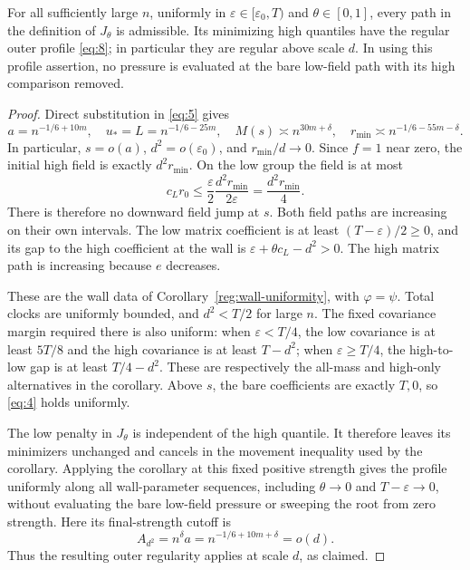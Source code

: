 \begin{lemma}
\label{fl:wall-profile}
For all sufficiently large $n$, uniformly in
$\varepsilon\in[\varepsilon_0,T)$ and $\theta\in[0,1]$, every path
in the definition of $J_\theta$ is admissible.  Its minimizing high
quantiles have the regular outer profile \eqref{eq:8}; in particular
they are regular above scale $d$.  In using this profile assertion,
no pressure is evaluated at the bare low-field path with its high
comparison removed.
\end{lemma}

\begin{proof}
Direct substitution in \eqref{eq:5} gives
\[
 a=n^{-1/6+10m},\quad u_*=L=n^{-1/6-25m},\quad
 M(s)\asymp n^{30m+\delta},\quad
 r_{\min}\asymp n^{-1/6-55m-\delta}.
\]
In particular, $s=o(a)$, $d^2=o(\varepsilon_0)$, and
$r_{\min}/d\to0$.  Since $f=1$ near zero, the initial high field is
exactly $d^2r_{\min}$.  On the low group the field is at most
\[
 c_Lr_0\le\frac\varepsilon2
                   \frac{d^2r_{\min}}{2\varepsilon}
             =\frac{d^2r_{\min}}4.
\]
There is therefore no downward field jump at $s$.  Both field paths
are increasing on their own intervals.  The low matrix coefficient
is at least $(T-\varepsilon)/2\ge0$, and its gap to the high coefficient
at the wall is $\varepsilon+\theta c_L-d^2>0$.  The high matrix path
is increasing because $e$ decreases.

These are the wall data of Corollary~\ref{reg:wall-uniformity}, with
$\varphi=\psi$. Total clocks are uniformly bounded, and $d^2<T/2$
for large $n$. The fixed covariance margin required there is also
uniform: when $\varepsilon<T/4$, the low covariance is at least
$5T/8$ and the high covariance is at least $T-d^2$; when
$\varepsilon\ge T/4$, the high-to-low gap is at least $T/4-d^2$.
These are respectively the all-mass and high-only alternatives in
the corollary. Above $s$, the bare coefficients are exactly $T,0$,
so \eqref{eq:4} holds uniformly.

The low penalty in $J_\theta$ is independent of the high quantile.
It therefore leaves its minimizers unchanged and cancels in the
movement inequality used by the corollary. Applying the corollary
at this fixed positive strength gives the profile uniformly along
all wall-parameter sequences, including $\theta\to0$ and
$T-\varepsilon\to0$, without evaluating the bare low-field pressure
or sweeping the root from zero strength. Here its final-strength
cutoff is
\[
 A_{d^2}=n^\delta a=n^{-1/6+10m+\delta}=o(d).
\]
Thus the resulting outer regularity applies at scale $d$, as claimed.
\end{proof}

